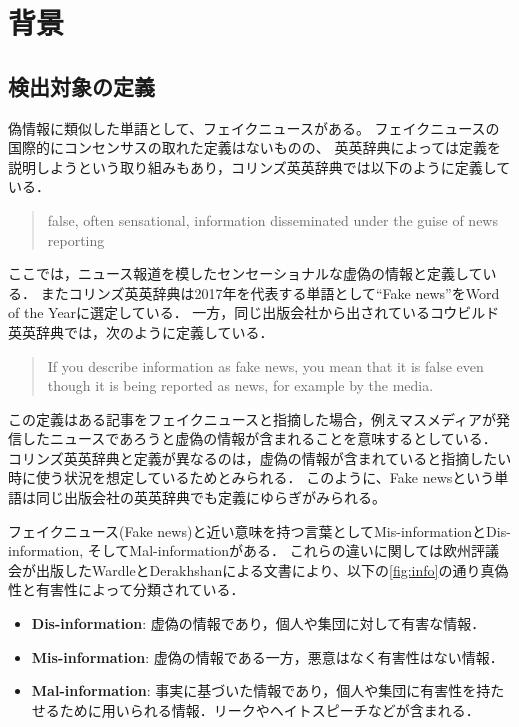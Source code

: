 \chapter{背景}
\label{ch:background}
\section{検出対象の定義}
偽情報に類似した単語として、フェイクニュースがある。
フェイクニュースの国際的にコンセンサスの取れた定義はないものの、
英英辞典によっては定義を説明しようという取り組みもあり，コリンズ英英辞典では以下のように定義している\cite{collins_fake}．
\begin{quote}
    false, often sensational, information disseminated under the guise of news reporting
\end{quote}
ここでは，ニュース報道を模したセンセーショナルな虚偽の情報と定義している．
またコリンズ英英辞典は2017年を代表する単語として``Fake news''をWord of the Yearに選定している\cite{collins_word}．
一方，同じ出版会社から出されているコウビルド英英辞典では，次のように定義している\cite{collins_fake}．
\begin{quote}
    If you describe information as fake news, you mean that it is false even though it is being reported as news, for example by the media.
\end{quote}
この定義はある記事をフェイクニュースと指摘した場合，例えマスメディアが発信したニュースであろうと虚偽の情報が含まれることを意味するとしている．
コリンズ英英辞典と定義が異なるのは，虚偽の情報が含まれていると指摘したい時に使う状況を想定しているためとみられる．
このように、Fake newsという単語は同じ出版会社の英英辞典でも定義にゆらぎがみられる。

フェイクニュース(Fake news)と近い意味を持つ言葉としてMis-informationとDis-information, そしてMal-informationがある．
これらの違いに関しては欧州評議会が出版したWardleとDerakhshanによる文書により、以下の\cref{fig:info}の通り真偽性と有害性によって分類されている\cite{wardle2017information}．

\begin{itemize}
    \item \textbf{Dis-information}: 虚偽の情報であり，個人や集団に対して有害な情報．
    \item \textbf{Mis-information}: 虚偽の情報である一方，悪意はなく有害性はない情報．%
    \item \textbf{Mal-information}: 事実に基づいた情報であり，個人や集団に有害性を持たせるために用いられる情報．リークやヘイトスピーチなどが含まれる．
\end{itemize}

